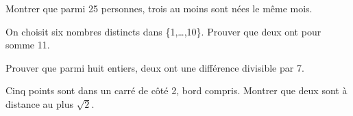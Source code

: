 \documentclass[11pt]{article}
\begin{document}
Montrer que parmi 25 personnes, trois au moins sont nées le même mois.\par
\vspace{5pt}
On choisit six nombres distincts dans \{1,…,10\}. Prouver que deux ont pour somme 11.\par
\vspace{5pt}
Prouver que parmi huit entiers, deux ont une différence divisible par 7.\par
\vspace{5pt}
Cinq points sont dans un carré de côté 2, bord compris. Montrer que deux sont à distance au plus \(\sqrt{2}\).\par
\vspace{5pt}
\end{document}

